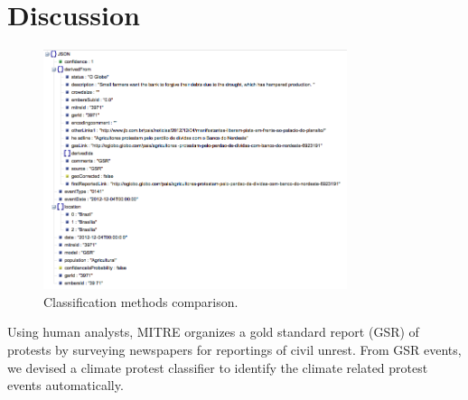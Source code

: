 \documentclass[9pt,twocolumn,twoside]{pnas-new}
\begin{document}
\section*{Discussion}


\begin{figure}[ht]
\centerline
{\includegraphics[width = 3.5in]{figures/gsr_event_json.png}}
\caption{Classification methods comparison.}
\label{resultsComp}
\end{figure}



Using human analysts, MITRE organizes a gold standard report (GSR) of protests by surveying newspapers for reportings of civil unrest. From GSR events, we devised a climate protest classifier to identify the climate related protest events automatically.
\end{document}
